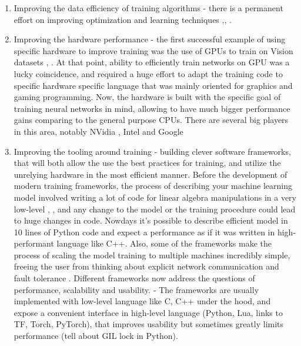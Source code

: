 \begin{enumerate}
    \item Improving the data efficiency of training algorithms - there is a permanent effort on
        improving optimization and learning techniques \cite{Adam},\cite{ImageNetInHour}, \cite{BatchNorm}.

    \item Improving the hardware performance - the first successful example of using specific
        hardware to improve training was the use of GPUs to train on Vision datasets \cite{NgCudnn}, \cite{AlexNet}.
        At that point, ability to efficiently train networks on GPU was a lucky coincidence, and
        required a huge effort to adapt the training code to specific hardware specific language that
        was mainly oriented for graphics and gaming programming. Now, the hardware is built with
        the specific goal of training neural networks in mind, allowing to have much bigger performance
        gains comparing to the general purpose CPUs. There are several big players in this area,
        notably NVidia \cite{NVidiaGPU}, Intel \cite{Nervana} and Google \cite{TPU}

    \item Improving the tooling around training - building clever software frameworks, that will 
        both allow the use the best practices for training, and utilize the unrelying hardware
        in the most efficient manner. Before the development of modern training frameworks, the process
        of describing your machine learning model involved writing a lot of code for linear algebra
        manipulations in a very low-level \cite{FORTRAN}, \cite{NumPy}, and any change to the model
        or the training procedure could lead to huge changes in code.
        Nowdays it's possible to describe efficient model in 10 lines of Python code and expect
        a performance as if it was written in high-performant language like C++.
        Also, some of the frameworks make the process of scaling the model training to multiple machines
        incredibly simple, freeing the user from thinking about explicit network communication and
        fault tolerance \cite{TensorFlow}.
        Different frameworks now address the questions of performance, scalability and usability.
        - The frameworks are usually implemented with low-level language like C, C++ under the hood, and expose
        a convenient interface in high-level language (Python, Lua, links to TF, Torch, PyTorch),
        that improves usability but sometimes greatly limits performance (tell about GIL lock in Python).
\end{enumerate}

